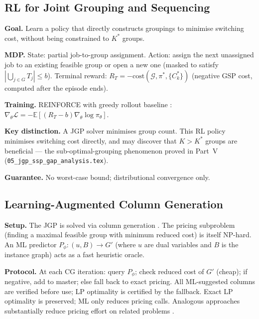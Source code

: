 \documentclass[11pt,a4paper]{article}
\theoremstyle{plain}
\theoremstyle{definition}
\newcommand{\Kstar}{K^*}
\newcommand{\calG}{\mathcal{G}}
\begin{document}
\subsection{RL for Joint Grouping and Sequencing}

\noindent\textbf{Goal.}
Learn a policy that directly constructs groupings to minimise switching cost,
without being constrained to $\Kstar$ groups.

\noindent\textbf{MDP.}
State: partial job-to-group assignment.
Action: assign the next unassigned job to an existing feasible group or open a
new one (masked to satisfy $|\bigcup_{j\in G}T_j| \le b$).
Terminal reward: $R_T = -\mathrm{cost}(\calG, \pi^*, \{C_k^*\})$ (negative GSP cost,
computed after the episode ends).

\noindent\textbf{Training.}
REINFORCE with greedy rollout baseline \cite{Kool2019}:
$\nabla_\theta \mathcal{L} = -\mathbb{E}[(R_T - b)\nabla_\theta \log \pi_\theta]$.

\noindent\textbf{Key distinction.}
A JGP solver minimises group count. This RL policy minimises switching cost
directly, and may discover that $K > \Kstar$ groups are beneficial --- the
sub-optimal-grouping phenomenon proved in Part~V
(\texttt{05\_jgp\_ssp\_gap\_analysis.tex}).

\noindent\textbf{Guarantee.}
No worst-case bound; distributional convergence only.

\subsection{Learning-Augmented Column Generation}

\noindent\textbf{Setup.}
The JGP is solved via column generation \cite{Crama1994Column}. The pricing
subproblem (finding a maximal feasible group with minimum reduced cost) is
itself NP-hard. An ML predictor $P_\phi : (u, B) \to G'$ (where $u$ are dual
variables and $B$ is the instance graph) acts as a fast heuristic oracle.

\noindent\textbf{Protocol.}
At each CG iteration: query $P_\phi$; check reduced cost of $G'$ (cheap); if
negative, add to master; else fall back to exact pricing.
All ML-suggested columns are verified before use; LP optimality is certified
by the fallback. Exact LP optimality is preserved; ML only reduces pricing
calls. Analogous approaches substantially reduce pricing effort on related
problems \cite{Morabit2021}.
\end{document}
